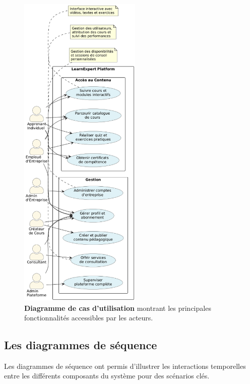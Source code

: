 \begin{figure}[p]
  \centering
  \includegraphics[width=0.52\textwidth,keepaspectratio]{images/usecase_diagram.png}
  \caption{\textbf{Diagramme de cas d'utilisation} montrant les principales fonctionnalités accessibles par les acteurs.}
  \label{fig:usecase_diagram}
\end{figure}
\clearpage

\subsection{Les diagrammes de séquence}
Les diagrammes de séquence ont permis d'illustrer les interactions temporelles entre les différents composants du système pour des scénarios clés.


